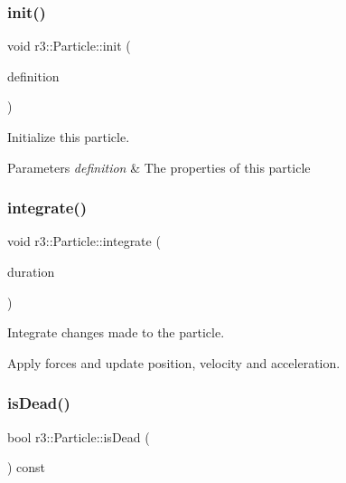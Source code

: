 \subsubsection{\texorpdfstring{init()}{init()}}
{\footnotesize\ttfamily void r3\+::\+Particle\+::init (\begin{DoxyParamCaption}\item[{const \mbox{\hyperlink{structr3_1_1_particle_def}{Particle\+Def}} \&}]{definition }\end{DoxyParamCaption})}



Initialize this particle. 


\begin{DoxyParams}{Parameters}
{\em definition} & The properties of this particle \\
\hline
\end{DoxyParams}
\mbox{\label{classr3_1_1_particle_aff134984d9bc7409579e16eca3e42b68}} 
\subsubsection{\texorpdfstring{integrate()}{integrate()}}
{\footnotesize\ttfamily void r3\+::\+Particle\+::integrate (\begin{DoxyParamCaption}\item[{\mbox{\hyperlink{namespacer3_ab2016b3e3f743fb735afce242f0dc1eb}{real}}}]{duration }\end{DoxyParamCaption})\hspace{0.3cm}{\ttfamily [virtual]}}



Integrate changes made to the particle. 

Apply forces and update position, velocity and acceleration. \mbox{\label{classr3_1_1_particle_aeeb9dd636d0851bc007ff718ef9140e9}} 
\subsubsection{\texorpdfstring{is\+Dead()}{isDead()}}
{\footnotesize\ttfamily bool r3\+::\+Particle\+::is\+Dead (\begin{DoxyParamCaption}{ }\end{DoxyParamCaption}) const}



